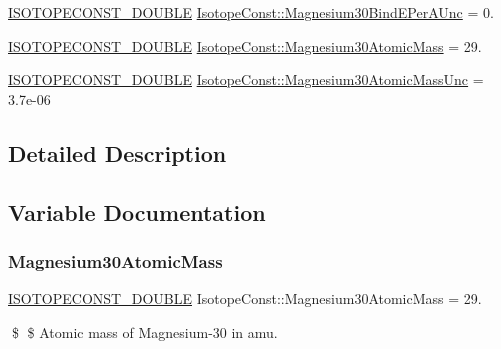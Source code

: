 \begin{DoxyCompactItemize}
\mbox{\hyperlink{group___isotope_const-_macros_ga8f45a7272ce02c0b4c65c44636ed719a}{I\+S\+O\+T\+O\+P\+E\+C\+O\+N\+S\+T\+\_\+\+D\+O\+U\+B\+LE}} \mbox{\hyperlink{group___isotope_const-_magnesium-_mg30_ga15655dd4f69888dcf6a2c5688ef83231}{Isotope\+Const\+::\+Magnesium30\+Bind\+E\+Per\+A\+Unc}} = 0.
\item 
\mbox{\hyperlink{group___isotope_const-_macros_ga8f45a7272ce02c0b4c65c44636ed719a}{I\+S\+O\+T\+O\+P\+E\+C\+O\+N\+S\+T\+\_\+\+D\+O\+U\+B\+LE}} \mbox{\hyperlink{group___isotope_const-_magnesium-_mg30_ga787529048dd99d479be95c623b89f45e}{Isotope\+Const\+::\+Magnesium30\+Atomic\+Mass}} = 29.
\item 
\mbox{\hyperlink{group___isotope_const-_macros_ga8f45a7272ce02c0b4c65c44636ed719a}{I\+S\+O\+T\+O\+P\+E\+C\+O\+N\+S\+T\+\_\+\+D\+O\+U\+B\+LE}} \mbox{\hyperlink{group___isotope_const-_magnesium-_mg30_gaeb1926a00ddca860b0788eeae4f11567}{Isotope\+Const\+::\+Magnesium30\+Atomic\+Mass\+Unc}} = 3.\+7e-\/06
\end{DoxyCompactItemize}


\subsection{Detailed Description}


\subsection{Variable Documentation}
\mbox{\label{group___isotope_const-_magnesium-_mg30_ga787529048dd99d479be95c623b89f45e}} 
\subsubsection{\texorpdfstring{Magnesium30\+Atomic\+Mass}{Magnesium30AtomicMass}}
{\footnotesize\ttfamily \mbox{\hyperlink{group___isotope_const-_macros_ga8f45a7272ce02c0b4c65c44636ed719a}{I\+S\+O\+T\+O\+P\+E\+C\+O\+N\+S\+T\+\_\+\+D\+O\+U\+B\+LE}} Isotope\+Const\+::\+Magnesium30\+Atomic\+Mass = 29.}

\$ \$ Atomic mass of Magnesium-\/30 in amu. \mbox{\label{group___isotope_const-_magnesium-_mg30_gaeb1926a00ddca860b0788eeae4f11567}} 
